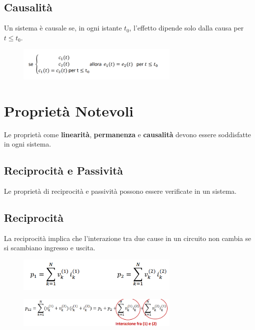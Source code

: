 \subsection*{Causalità}
Un sistema è causale se, in ogni istante \( t_0 \), l'effetto dipende solo dalla causa per \( t \leq t_0 \).

\begin{figure}[H]
    \centering
    \includegraphics[width=0.7\textwidth]{capitoli/capitolo2/immagini/image10.png}
\end{figure}

\section{Proprietà Notevoli}

Le proprietà come \textbf{linearità}, \textbf{permanenza} e \textbf{causalità} devono essere soddisfatte in ogni sistema.

\subsection*{Reciprocità e Passività}
Le proprietà di reciprocità e passività possono essere verificate in un sistema.

\subsection*{Reciprocità}
La reciprocità implica che l'interazione tra due cause in un circuito non cambia se si scambiano ingresso e uscita.

\begin{figure}[H]
    \centering
    \includegraphics[width=0.7\textwidth]{capitoli/capitolo2/immagini/image11.png}
\end{figure}


\begin{figure}[H]
    \centering
    \includegraphics[width=0.7\textwidth]{capitoli/capitolo2/immagini/image12.png}
\end{figure}

